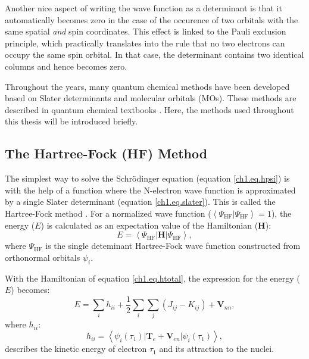 Another nice aspect of writing the wave function as a determinant is that it automatically becomes zero in the case of the occurence of two orbitals with the same spatial \textit{and} spin coordinates. This effect is linked to the Pauli exclusion principle, which practically translates into the rule that no two electrons can occupy the same spin orbital. In that case, the determinant contains two identical columns and hence becomes zero.

Throughout the years, many quantum chemical methods have been developed based on Slater determinants and molecular orbitals (MOs). These methods are described in quantum chemical textbooks \cite{szabo}. Here, the methods used throughout this thesis will be introduced briefly.

\subsection{The Hartree-Fock (HF) Method}
The simplest way to solve the Schr\"{o}dinger equation (equation \ref{ch1.eq.hpsi}) is with the help of a function where the N-electron wave function is approximated by a single Slater determinant (equation \ref{ch1.eq.slater}). This is called the Hartree-Fock method \cite{hartree1,hartree2,hartree3,fock}. For a normalized wave function ($\left< \Psi_\mathrm{HF} | \Psi_\mathrm{HF} \right> = 1$), the energy ($E$) is calculated as an expectation value of the Hamiltonian ($\mathbf{H}$):
\begin{equation}
E=\left< \Psi_\mathrm{HF} | \mathbf{H} | \Psi_\mathrm{HF} \right>,
\label{ch1.eq.hfexp}
\end{equation}
where $\Psi_\mathrm{HF}$ is the single deteminant Hartree-Fock wave function constructed from orthonormal orbitals $\psi_i$.

With the Hamiltonian of equation \ref{ch1.eq.htotal}, the expression for the energy ($E$) becomes:
\begin{equation}
E=\sum_i h_{ii} + \frac{1}{2} \sum_i\sum_j (J_{ij} - K_{ij}) + \mathbf{V}_{nn},
\label{ch1.eq.hfexp_detailed}
\end{equation}
where $h_{ii}$:
\begin{equation}
h_{ii} = \left< \psi_i(\tau_1) | \mathbf{T}_{e} + \mathbf{V}_{en} | \psi_i(\tau_1)\right>,
\end{equation}
describes the kinetic energy of electron $\tau_1$ and its attraction to the nuclei.

